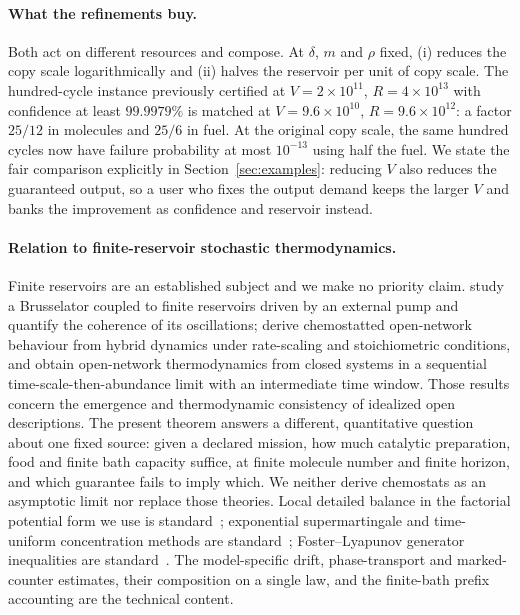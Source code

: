 \documentclass[11pt,a4paper]{article}
\theoremstyle{plain}
\theoremstyle{definition}
\theoremstyle{remark}
\begin{document}
\paragraph{What the refinements buy.}
Both act on different resources and compose. At $\delta$, $m$ and $\rho$ fixed, (i) reduces the copy scale logarithmically and (ii) halves the reservoir per unit of copy scale. The hundred-cycle instance previously certified at $V=2\times10^{11}$, $R=4\times10^{13}$ with confidence at least $99.9979\%$ is matched at $V=9.6\times10^{10}$, $R=9.6\times10^{12}$: a factor $25/12$ in molecules and $25/6$ in fuel. At the original copy scale, the same hundred cycles now have failure probability at most $10^{-13}$ using half the fuel. We state the fair comparison explicitly in Section~\ref{sec:examples}: reducing $V$ also reduces the guaranteed output, so a user who fixes the output demand keeps the larger $V$ and banks the improvement as confidence and reservoir instead.

\paragraph{Relation to finite-reservoir stochastic thermodynamics.}
Finite reservoirs are an established subject and we make no priority claim. \citet{fritz2020} study a Brusselator coupled to finite reservoirs driven by an external pump and quantify the coherence of its oscillations; \citet{remlein2025} derive chemostatted open-network behaviour from hybrid dynamics under rate-scaling and stoichiometric conditions, and \citet{remlein2026} obtain open-network thermodynamics from closed systems in a sequential time-scale-then-abundance limit with an intermediate time window. Those results concern the emergence and thermodynamic consistency of idealized open descriptions. The present theorem answers a different, quantitative question about one fixed source: given a declared mission, how much catalytic preparation, food and finite bath capacity suffice, at finite molecule number and finite horizon, and which guarantee fails to imply which. We neither derive chemostats as an asymptotic limit nor replace those theories. Local detailed balance in the factorial potential form we use is standard~\citep{schmiedl2007,rao2016,seifert2012}; exponential supermartingale and time-uniform concentration methods are standard~\citep{chernoff1952,howard2021}; Foster--Lyapunov generator inequalities are standard~\citep{meyn1993,gupta2014,anderson2018}. The model-specific drift, phase-transport and marked-counter estimates, their composition on a single law, and the finite-bath prefix accounting are the technical content.
\end{document}

